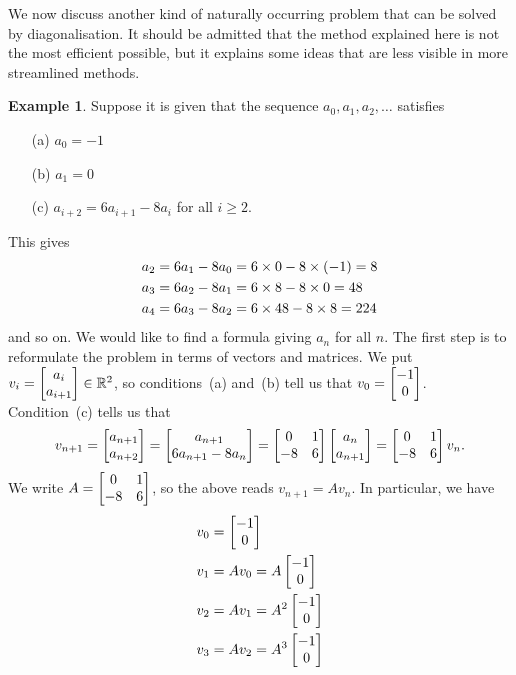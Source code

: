 \documentclass[reqno]{amsart}
\theoremstyle{definition}
\newtheorem{example}[theorem]{Example}
\begin{document}
We now discuss another kind of naturally occurring problem that can be
solved by diagonalisation.  It should be admitted that the method
explained here is not the most efficient possible, but it explains
some ideas that are less visible in more streamlined methods.

\begin{example}\label{eg-difference-i}
 Suppose it is given that the sequence $a_0,a_1,a_2,\dotsc$ satisfies
 \begin{itemize}
  \item[(a)] $a_0=-1$
  \item[(b)] $a_1=0$
  \item[(c)] $a_{i+2}=6a_{i+1}-8a_i$ for all $i\geq 2$.
 \end{itemize}
 This gives
 \begin{align*}
  a_2 &= 6a_1 - 8a_0 = 6\times 0 - 8\times(-1) = 8 \\
  a_3 &= 6a_2 - 8a_1 = 6\times 8 - 8\times 0 = 48 \\
  a_4 &= 6a_3 - 8a_2 = 6\times 48 - 8\times 8 = 224
 \end{align*}
 and so on.  We would like to find a formula giving $a_n$ for all
 $n$.  The first step is to reformulate the problem in terms of
 vectors and matrices.  We put $v_i=\left[\begin{matrix} a_i\\ a_{i+1}\end{matrix}\right]\in{\mathbb{R}}^2$, so
 conditions~(a) and~(b) tell us that $v_0=\left[\begin{matrix} -1\\ 0\end{matrix}\right]$.
 Condition~(c) tells us that
 \[ v_{n+1} =
     \left[\begin{matrix} a_{n+1} \\ a_{n+2} \end{matrix}\right] =
     \left[\begin{matrix} a_{n+1} \\ 6a_{n+1}-8a_n \end{matrix}\right] =
     \left[\begin{matrix} 0 & 1 \\ -8 & 6 \end{matrix}\right]\left[\begin{matrix} a_n \\ a_{n+1}\end{matrix}\right] =
     \left[\begin{matrix} 0 & 1 \\ -8 & 6 \end{matrix}\right] v_n.
 \]
 We write $A=\left[\begin{matrix} 0&1 \\ -8&6\end{matrix}\right]$, so the above reads $v_{n+1}=Av_n$.
 In particular, we have
 \begin{align*}
  v_0 &= \bbm -1 \\ 0 \ebm \\
  v_1 &= Av_0 = A\bbm -1 \\ 0 \ebm \\
  v_2 &= Av_1 = A^2\bbm -1 \\ 0 \ebm \\
  v_3 &= Av_2 = A^3\bbm -1 \\ 0 \ebm

\end{align*}
\end{example}
\end{document}
